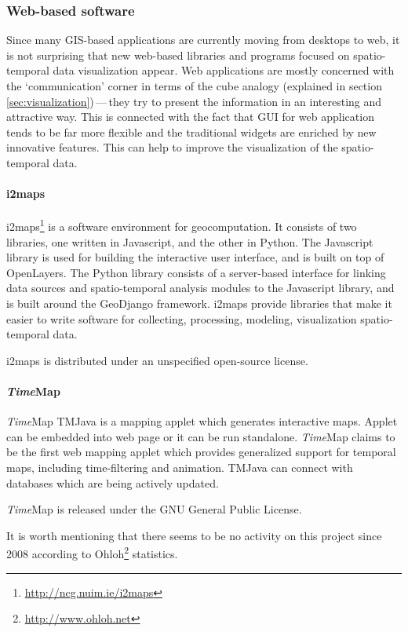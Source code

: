 \documentclass[a4paper,12pt,oneside]{book}
\newcommand{\dash}{\mbox{\,---\,}}
\begin{document}
\subsubsection{Web-based software}
Since many GIS-based applications are currently moving from desktops to web, it is not surprising that
new web-based libraries and programs focused on  spatio-temporal data visualization appear.
Web applications are mostly concerned with the `communication' corner in terms of the cube analogy
(explained in section \ref{sec:visualization})\dash they try to present the information
in an interesting and attractive way. This is connected with the fact that GUI for web application
tends to be  far more flexible and the traditional widgets are enriched by new innovative features.
This can help to improve the visualization of the spatio-temporal data.

\paragraph{i2maps} i2maps\footnote{\url{http://ncg.nuim.ie/i2maps}} is a software environment for geocomputation.
It consists of two libraries, one written in Javascript, and the other in Python.
The Javascript library is used for building the interactive user interface, and is built on top of OpenLayers.
The Python library consists of a server-based interface for linking data sources
and spatio-temporal analysis modules to the Javascript library, and is built around the GeoDjango framework.
i2maps provide libraries that make it easier to write software for collecting,
processing, modeling, visualization spatio-temporal data.

i2maps is distributed under an unspecified open-source license.

\paragraph{\emph{Time}Map} \emph{Time}Map TMJava is a mapping applet
which generates interactive maps. Applet can be embedded into web page
or it can be run standalone.
\emph{Time}Map claims to be the first web mapping applet which provides
generalized support for temporal maps, including time-filtering and animation.
TMJava can connect with databases which are being actively updated.

\emph{Time}Map is released under the GNU General Public License.

It is worth mentioning that there seems to be no activity on this project since 2008 according to
Ohloh\footnote{\url{http://www.ohloh.net}} statistics.
\end{document}
